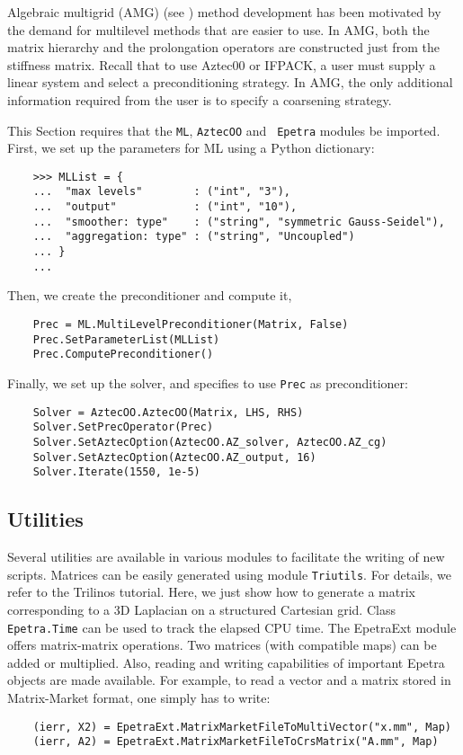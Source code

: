 \documentclass[10pt,relax]{SANDreport}
\begin{document}
Algebraic multigrid (AMG) (see \cite[Section 8]{Briggs2000}) method
development has been motivated by the demand for multilevel methods
that are easier to use.  In AMG, both the matrix hierarchy and the
prolongation operators are constructed just from the stiffness matrix.
Recall that to use Aztec00 or IFPACK, a user must supply a linear
system and select a preconditioning strategy.  In AMG, the only
additional information required from the user is to specify a
coarsening strategy.

This Section requires that the {\tt ML}, {\tt AztecOO} and {\tt
  Epetra} modules be imported. First, we set up the parameters for ML
using a Python dictionary:
\begin{verbatim}
    >>> MLList = {
    ...  "max levels"        : ("int", "3"),
    ...  "output"            : ("int", "10"),
    ...  "smoother: type"    : ("string", "symmetric Gauss-Seidel"),
    ...  "aggregation: type" : ("string", "Uncoupled")
    ... }
    ...
\end{verbatim}
Then, we create the preconditioner and compute it,
\begin{verbatim}
    Prec = ML.MultiLevelPreconditioner(Matrix, False)
    Prec.SetParameterList(MLList)
    Prec.ComputePreconditioner()
\end{verbatim}
Finally, we set up the solver, and specifies to use {\tt Prec} as
preconditioner:
\begin{verbatim}
    Solver = AztecOO.AztecOO(Matrix, LHS, RHS)
    Solver.SetPrecOperator(Prec)
    Solver.SetAztecOption(AztecOO.AZ_solver, AztecOO.AZ_cg)
    Solver.SetAztecOption(AztecOO.AZ_output, 16)
    Solver.Iterate(1550, 1e-5)
\end{verbatim}

\subsection{Utilities}
\label{subsec:utilities}

Several utilities are available in various modules to facilitate the
writing of new scripts.  Matrices can be easily generated using module
{\tt Triutils}. For details, we refer to the Trilinos tutorial. Here,
we just show how to generate a matrix corresponding to a 3D Laplacian
on a structured Cartesian grid.  Class {\tt Epetra.Time} can be used
to track the elapsed CPU time.  The EpetraExt module offers
matrix-matrix operations. Two matrices (with compatible maps) can be
added or multiplied. Also, reading and writing capabilities of
important Epetra objects are made available. For example, to read a
vector and a matrix stored in Matrix-Market format, one simply has to
write:
\begin{verbatim}
    (ierr, X2) = EpetraExt.MatrixMarketFileToMultiVector("x.mm", Map)
    (ierr, A2) = EpetraExt.MatrixMarketFileToCrsMatrix("A.mm", Map)
\end{verbatim}
\end{document}
